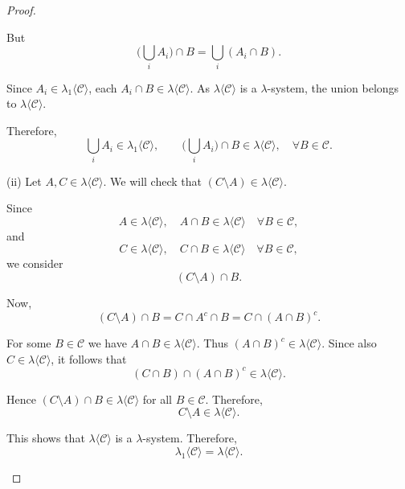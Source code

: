 \documentclass[11pt]{article}
\theoremstyle{definition}
\begin{document}
\begin{proof}
\begin{enumerate}
        But
        \[
        \Big(\bigcup_i A_i\Big) \cap B = \bigcup_i (A_i \cap B).
        \]
        
        Since $A_i \in \lambda_1\langle \mathcal{C}\rangle$, each $A_i \cap B \in \lambda\langle \mathcal{C}\rangle$. As $\lambda\langle \mathcal{C}\rangle$ is a $\lambda$-system, the union belongs to $\lambda\langle \mathcal{C}\rangle$.  
        
        \medskip
        
        Therefore,
        \[
        \bigcup_i A_i \in \lambda_1\langle \mathcal{C}\rangle, \qquad 
        \Big(\bigcup_i A_i\Big) \cap B \in \lambda\langle \mathcal{C}\rangle, \quad \forall B \in \mathcal{C}.
        \]


        (ii) Let $A,C \in \lambda\langle \mathcal{C}\rangle$. We will check that $(C \setminus A) \in \lambda\langle \mathcal{C}\rangle$.

        \medskip

        Since
        \[
        A \in \lambda\langle \mathcal{C}\rangle, \quad A \cap B \in \lambda\langle \mathcal{C}\rangle \quad \forall B \in \mathcal{C},
        \]
        and
        \[
        C \in \lambda\langle \mathcal{C}\rangle, \quad C \cap B \in \lambda\langle \mathcal{C}\rangle \quad \forall B \in \mathcal{C},
        \]
        we consider
        \[
        (C \setminus A) \cap B.
        \]
        
        \medskip
        
        Now,
        \[
        (C \setminus A) \cap B 
        = C \cap A^c \cap B
        = C \cap (A \cap B)^c.
        \]
        
        For some $B \in \mathcal{C}$ we have $A \cap B \in \lambda\langle \mathcal{C}\rangle$.  
        Thus $(A \cap B)^c \in \lambda\langle \mathcal{C}\rangle$.  
        Since also $C \in \lambda\langle \mathcal{C}\rangle$, it follows that
        \[
        (C \cap B) \cap (A \cap B)^c \in \lambda\langle \mathcal{C}\rangle.
        \]
        
        Hence $(C \setminus A) \cap B \in \lambda\langle \mathcal{C}\rangle$ for all $B \in \mathcal{C}$.  
        Therefore,
        \[
        C \setminus A \in \lambda\langle \mathcal{C}\rangle.
        \]
        
        \medskip
        
        This shows that $\lambda\langle \mathcal{C}\rangle$ is a $\lambda$-system. Therefore,
        \[
        \lambda_1\langle \mathcal{C}\rangle = \lambda\langle \mathcal{C}\rangle.
        \]
        

\end{enumerate}
\end{proof}
\end{document}
